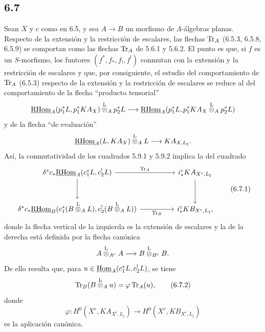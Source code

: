 \subsection*{6.7}
Sean $X$ y $c$ como en 6.5, y sea $A\to B$ un morfismo de $\Lambda$-álgebras planas. Respecto de la extensión y la restricción de escalares, las flechas $\operatorname{Tr}_A$ (6.5.3, 6.5.8, 6.5.9) se comportan como las flechas $\operatorname{Tr}_A$ de 5.6.1 y 5.6.2. El punto es que, si $f$ es un $S$-morfismo, los funtores $(f^*,f_*,f_!,f^!)$ conmutan con la extensión y la restricción de escalares y que, por consiguiente, el estudio del comportamiento de $\operatorname{Tr}_A$ (6.5.3) respecto de la extensión y la restricción de escalares se reduce al del comportamiento de la flecha ``producto tensorial''
\[
\underline{\mathrm{RHom}}_A(p_1^*L,p_1^*KA_X)\overset{\mathrm L}{\otimes}_Ap_2^*L
\longrightarrow
\underline{\mathrm{RHom}}_A(p_1^*L,p_1^*KA_X\overset{\mathrm L}{\otimes}_Ap_2^*L)
\]
y de la flecha ``de evaluación''
\[
\underline{\mathrm{RHom}}_A(L,KA_X)\overset{\mathrm L}{\otimes}_A L\longrightarrow KA_{X,L_{\natural}}.
\]
Así, la conmutatividad de los cuadrados 5.9.1 y 5.9.2 implica la del cuadrado
\begin{equation}
\begin{tikzcd}[column sep=huge,row sep=large]
\delta^*c_*\uRHom_A(c_1^*L,c_2^!L) \arrow[r,"\Tr_A"] \arrow[d]
& i_*^cKA_{X^c,L_{\natural}} \arrow[d]\\
\delta^*c_*\uRHom_B(c_1^*(B\lten_A L),c_2^!(B\lten_A L)) \arrow[r,"\Tr_B"']
& i_*^cKB_{X^c,L_{\natural}},
\end{tikzcd}
\tag{6.7.1}
\end{equation}
donde la flecha vertical de la izquierda es la extensión de escalares y la de la derecha está definida por la flecha canónica
\[
A\overset{\mathrm L}{\otimes}_{A^e}A\longrightarrow B\overset{\mathrm L}{\otimes}_{B^e}B.
\]
De ello resulta que, para $u\in\underline{\operatorname{Hom}}_A(c_1^*L,c_2^!L)$, se tiene
\begin{equation}
\operatorname{Tr}_B(B\overset{\mathrm L}{\otimes}_Au)=\varphi\operatorname{Tr}_A(u),
\tag{6.7.2}
\end{equation}
donde
\[
\varphi:H^0(X^c,KA_{X^c,L_{\natural}})\longrightarrow H^0(X^c,KB_{X^c,L_{\natural}})
\]
es la aplicación canónica.

